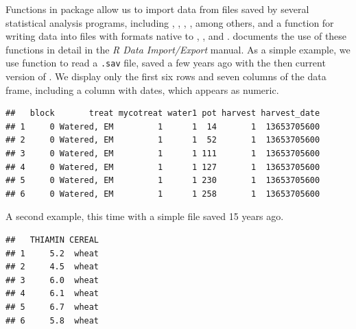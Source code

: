 \documentclass[krantz2]{krantz}\usepackage{knitr}
\begin{document}
Functions in package  allow us to import data from files saved by several statistical analysis programs, including , , , ,  among others, and a function for writing data into files with formats native to , , and . \Rlang documents the use of these functions in detail in the \emph{R Data Import/Export} manual. As a simple example, we use function  to read a \texttt{.sav} file, saved a few years ago with the then current version of . We display only the first six rows and seven columns of the data frame, including a column with dates, which appears as numeric.

\begin{knitrout}\footnotesize
{}\color{fgcolor}\begin{kframe}
\begin{alltt}
 \hlkwb{<-} \hlstd{(} \hlstd{=} \hlstd{,}  \hlstd{=} \hlstd{)}
\hlstd{my_spss.df[}\hlopt{:}\hlstd{,} \hlstd{(}\hlopt{:}\hlstd{,} \hlstd{)]}
\end{alltt}
\begin{verbatim}
##   block       treat mycotreat water1 pot harvest harvest_date
## 1     0 Watered, EM         1      1  14       1  13653705600
## 2     0 Watered, EM         1      1  52       1  13653705600
## 3     0 Watered, EM         1      1 111       1  13653705600
## 4     0 Watered, EM         1      1 127       1  13653705600
## 5     0 Watered, EM         1      1 230       1  13653705600
## 6     0 Watered, EM         1      1 258       1  13653705600
\end{verbatim}
\end{kframe}
\end{knitrout}

A second example, this time with a simple  file saved 15 years ago.

\begin{knitrout}\footnotesize
{}\color{fgcolor}\begin{kframe}
\begin{alltt}
 \hlkwb{<-} \hlstd{(} \hlstd{=} \hlstd{,}  \hlstd{=} \hlstd{)}
\end{alltt}
\begin{verbatim}
##   THIAMIN CEREAL
## 1     5.2  wheat
## 2     4.5  wheat
## 3     6.0  wheat
## 4     6.1  wheat
## 5     6.7  wheat
## 6     5.8  wheat
\end{verbatim}
\end{kframe}
\end{knitrout}
\end{document}
